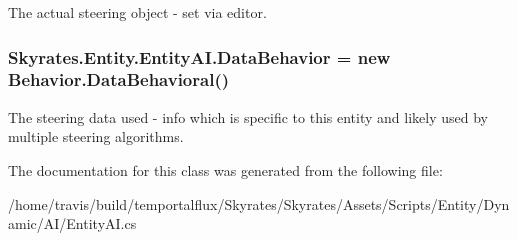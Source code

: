 The actual steering object -\/ set via editor. 

\hypertarget{class_skyrates_1_1_entity_1_1_entity_a_i_afd9ea7ff8d90b2042e25656bd950781e}{
\subsubsection[{Data\-Behavior}]{ Skyrates.\-Entity.\-Entity\-A\-I.\-Data\-Behavior = new {\bf Behavior.\-Data\-Behavioral}()}}\label{class_skyrates_1_1_entity_1_1_entity_a_i_afd9ea7ff8d90b2042e25656bd950781e}


The steering data used -\/ info which is specific to this entity and likely used by multiple steering algorithms. 



The documentation for this class was generated from the following file\-:\begin{DoxyCompactItemize}
\item 
/home/travis/build/temportalflux/\-Skyrates/\-Skyrates/\-Assets/\-Scripts/\-Entity/\-Dynamic/\-A\-I/Entity\-A\-I.\-cs\end{DoxyCompactItemize}
